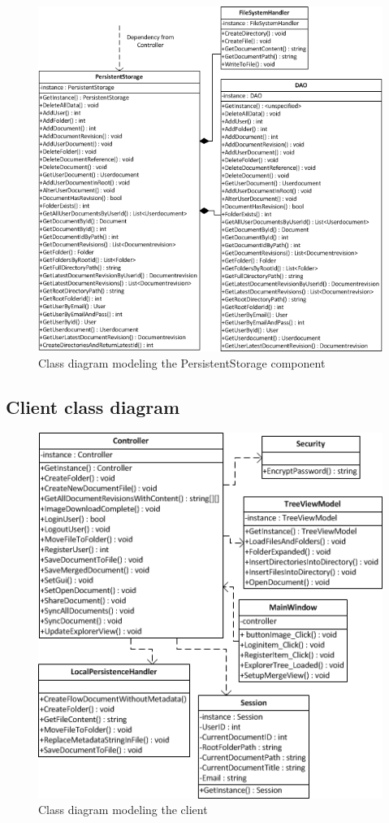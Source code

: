 \documentclass[a4paper,11pt,report]{report}
\begin{document}
\begin{figure}[H]
  \centering
\includegraphics[]{./classdiagramserver2}
\caption{Class diagram modeling the PersistentStorage component}
\end{figure}

\subsection{Client class diagram}
\begin{figure}[H]
  \centering
\includegraphics[]{./classdiagramclient}
\caption{Class diagram modeling the client}
\end{figure}
\end{document}
